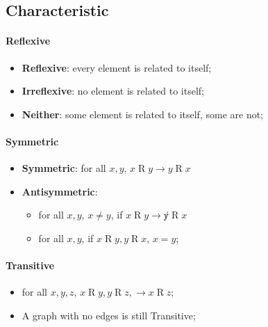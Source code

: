 \documentclass[letterpaper, 11pt]{article}
\begin{document}
    \subsection{Characteristic}
      \paragraph{Reflexive}
      \begin{itemize}
        \item \textbf{Reflexive}: every element is related to itself;
        \item \textbf{Irreflexive}: no element is related to itself;
        \item \textbf{Neither}: some element is related to itself, some are not;
      \end{itemize}
      
      \paragraph{Symmetric}
      \begin{itemize}
        \item \textbf{Symmetric}: for all $ x, y $, $ x \mathrel{R} y \to y \mathrel{R} x $
        \item \textbf{Antisymmetric}: 
        \begin{itemize}
          \item for all $ x, y $, $ x \neq y $, if $ x \mathrel{R} y \to \not y \mathrel{R} x $
          \item for all $ x, y $, if $ x \mathrel{R} y, y \mathrel{R} x $, $ x = y $;
        \end{itemize}
      \end{itemize}
      
      \paragraph{Transitive}
      \begin{itemize}
        \item for all $ x, y, z $, $ x \mathrel{R} y, y \mathrel{R} z, \to x \mathrel{R} z $;
        \item A graph with no edges is still Transitive;
      \end{itemize}
      
\end{document}
